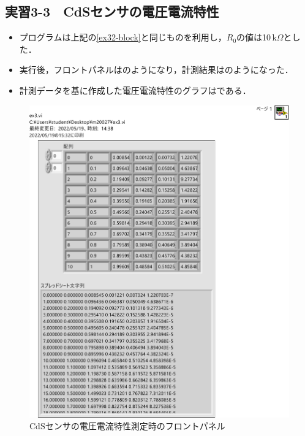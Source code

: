 \clearpage
\subsection{実習3-3　CdSセンサの電圧電流特性}
\begin{itemize}
	\item プログラムは上記の\ref{ex32-block}と同じものを利用し，$R_{0}$の値は10\,k\rm{$\Omega$}とした．
	\item 実行後，フロントパネルはのようになり，計測結果はのようになった．
	\item 計測データを基に作成した電圧電流特性のグラフはである．
\end{itemize}

 \begin{figure}[h]
  \centering
\includegraphics[scale=0.35]{./fig/ex33-flont.pdf}
\caption{CdSセンサの電圧電流特性測定時のフロントパネル}
\label{fig:ex33-flont}
\end{figure}

